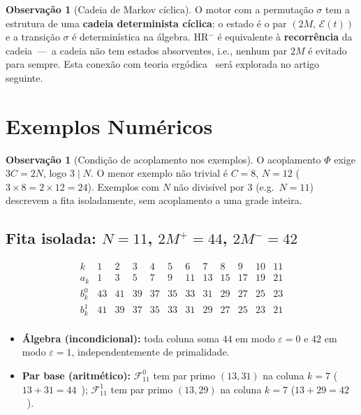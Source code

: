 \documentclass[12pt, a4paper]{article}
\theoremstyle{plain}
\theoremstyle{definition}
\newtheorem{remark}[theorem]{Observação}
\theoremstyle{remark}
\begin{document}
	\begin{remark}[Cadeia de Markov cíclica]
		O motor com a permutação $\sigma$ tem a estrutura de uma
		\textbf{cadeia determinista cíclica}: o estado é o par
		$(2M,\,\mathcal{E}(t))$ e a transição $\sigma$ é determinística
		na álgebra.  HR$^-$ é equivalente à \textbf{recorrência} da
		cadeia~---~a cadeia não tem estados absorventes, i.e., nenhum
		par $2M$ é evitado para sempre.  Esta conexão com teoria
		ergódica~\cite{grade} será explorada no artigo seguinte.
	\end{remark}
	
	\section{Exemplos Numéricos}
	\label{sec:exemplos}
	
	\begin{remark}[Condição de acoplamento nos exemplos]
		O acoplamento $\Phi$ exige $3C=2N$, logo $3\mid N$.  O menor
		exemplo não trivial é $C=8$, $N=12$
		($3\times8=2\times12=24$).  Exemplos com $N$ não divisível por
		$3$ (e.g.\ $N=11$) descrevem a fita isoladamente, sem acoplamento
		a uma grade inteira.
	\end{remark}
	
	\subsection{Fita isolada: $N=11$, $2M^+=44$, $2M^-=42$}
	
	\[
	\begin{array}{c|ccccccccccc}
		k    & 1 & 2 & 3 & 4 & 5 & 6 & 7 & 8 & 9 & 10 & 11\\
		\hline
		a_k  & 1 & 3 & 5 & 7 & 9 &11 &13 &15 &17 &19  &21 \\
		b_k^0& 43&41 &39 &37 &35 &33 &31 &29 &27 &25  &23 \\
		b_k^1& 41&39 &37 &35 &33 &31 &29 &27 &25 &23  &21 \\
	\end{array}
	\]
	
	\begin{itemize}
		\item \textbf{Álgebra (incondicional):} toda coluna soma $44$
		em modo $\varepsilon=0$ e $42$ em modo $\varepsilon=1$,
		independentemente de primalidade.
		\item \textbf{Par base (aritmético):}
		$\mathcal{F}_{11}^0$ tem par primo $(13,31)$ na coluna
		$k=7$ ($13+31=44$~\checkmark);
		$\mathcal{F}_{11}^1$ tem par primo $(13,29)$ na coluna
		$k=7$ ($13+29=42$~\checkmark).
	\end{itemize}
	
\end{document}

